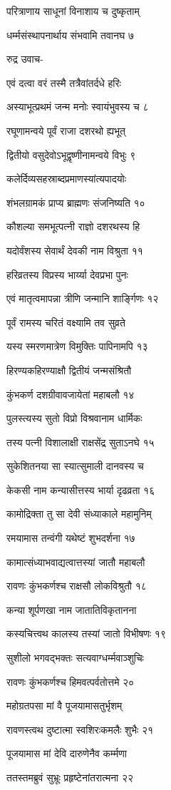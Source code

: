 परित्राणाय साधूनां विनाशाय च दुष्कृताम्

धर्म्मसंस्थापनार्थाय संभवामि तवानघ ७

रुद्र उवाच-

एवं दत्वा वरं तस्मै तत्रैवांतर्दधे हरिः

अस्याभूत्प्रथमं जन्म मनोः स्वायंभुवस्य च ८

रघूणामन्वये पूर्वं राजा दशरथो ह्यभूत्

द्वितीयो वसुदेवोऽभूद्वृष्णीनामन्वये विभुः ९

कलेर्दिव्यसहस्राब्दप्रमाणस्यांत्यपादयोः

शंभलग्रामकं प्राप्य ब्राह्मणः संजनिष्यति १०

कौशल्या समभूत्पत्नी राज्ञो दशरथस्य हि

यदोर्वंशस्य सेवार्थं देवकी नाम विश्रुता ११

हरिव्रतस्य विप्रस्य भार्य्या देवप्रभा पुनः

एवं मातृत्वमापन्ना त्रीणि जन्मानि शार्ङ्गिणः १२

पूर्वं रामस्य चरितं वक्ष्यामि तव सुव्रते

यस्य स्मरणमात्रेण विमुक्तिः पापिनामपि १३

हिरण्यकहिरण्याक्षौ द्वितीयं जन्मसंश्रितौ

कुंभकर्ण दशग्रीवावजायेतां महाबलौ १४

पुलस्त्यस्य सुतो विप्रो विश्रवानाम धार्मिकः

तस्य पत्नी विशालाक्षी राक्षसेंद्र सुताऽनघे १५

सुकेशितनया सा स्यात्सुमाली दानवस्य च

केकसी नाम कन्यासीत्तस्य भार्या दृढव्रता १६

कामोद्रिक्ता तु सा देवी संध्याकाले महामुनिम्

रमयामास तन्वंगी यथेष्टं शुभदर्शना १७

कामात्संध्याभवाद्यत्वात्तस्यां जातौ महाबलौ

रावणः कुंभकर्णश्च राक्षसौ लोकविश्रुतौ १८

कन्या शूर्पणखा नाम जातातिविकृतानना

कस्यचित्त्वथ कालस्य तस्यां जातो विभीषणः १९

सुशीलो भगवद्भक्तः सत्यवाग्धर्म्मवाञ्शुचिः

रावणः कुंभकर्णश्च हिमवत्पर्वतोत्तमे २०

महोग्रतपसा मां वै पूजयामासतुर्भृशम्

रावणस्त्वथ दुष्टात्मा स्वशिरःकमलैः शुभैः २१

पूजयामास मां देवि दारुणेनैव कर्म्मणा

ततस्तमब्रुवं सुभ्रूः प्रहृष्टेनांतरात्मना २२

